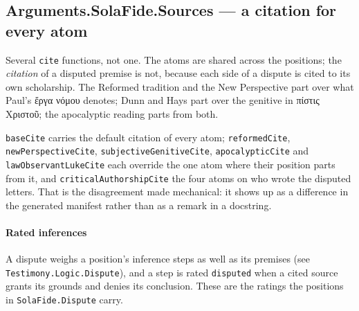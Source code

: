 \documentclass[11pt]{article}
\begin{document}
\subsection*{Arguments.SolaFide.Sources — a citation for every atom}
Several \texttt{cite} functions, not one. The atoms are shared across the positions; the \emph{citation} of a disputed premise is not, because each side of a dispute is cited to its own scholarship. The Reformed tradition and the New Perspective part over what Paul's ἔργα νόμου denotes; Dunn and Hays part over the genitive in πίστις Χριστοῦ; the apocalyptic reading parts from both.

\texttt{base\allowbreak{}Cite} carries the default citation of every atom; \texttt{reformed\allowbreak{}Cite}, \texttt{new\allowbreak{}Perspective\allowbreak{}Cite}, \texttt{subjective\allowbreak{}Genitive\allowbreak{}Cite}, \texttt{apocalyptic\allowbreak{}Cite} and \texttt{law\allowbreak{}Observant\allowbreak{}Luke\allowbreak{}Cite} each override the one atom where their position parts from it, and \texttt{critical\allowbreak{}Authorship\allowbreak{}Cite} the four atoms on who wrote the disputed letters. That is the disagreement made mechanical: it shows up as a difference in the generated manifest rather than as a remark in a docstring.

\paragraph*{Rated inferences}
\leavevmode\par
A dispute weighs a position's inference steps as well as its premises (see \texttt{Testimony.Logic.Dispute}), and a step is rated \texttt{disputed} when a cited source grants its grounds and denies its conclusion. These are the ratings the positions in \texttt{Sola\allowbreak{}Fide.Dispute} carry.
\end{document}
